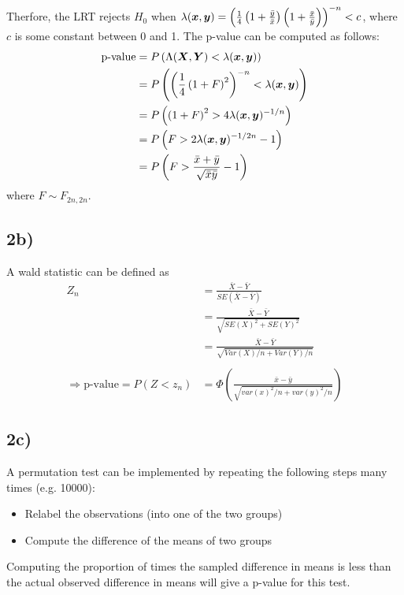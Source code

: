 \documentclass[11pt]{article}
\newcommand{\p}[1]{\left(#1\right)}
\begin{document}
Therfore, the LRT rejects $H_0$ when $\lambda(\bm x, \bm y) = \p{\frac{1}{4}\p{1+\frac{\ybar}{\xbar}}\p{1+\frac{\xbar}{\ybar}}}^{-n} < c$, where $c$ is some constant between 0 and 1. The p-value can be computed as follows:
\[
\begin{aligned}
  \text{p-value} &= P\p{\Lambda(\bm X,\bm Y) < \lambda(\bm x,\bm y)}\\
                 &= P\p{ \p{\frac{1}{4}\p{1+F}^2}^{-n}< \lambda(\bm x,\bm y)}\\
                 &= P\p{ \p{1+F}^2 > 4\lambda(\bm x,\bm y)^{-1/n}}\\
                 &= P\p{ F > 2\lambda(\bm x,\bm y)^{-1/2n}-1}\\
                 &= P\p{ F > \frac{\xbar+\ybar}{\sqrt{\xbar\ybar}}-1}\\
\end{aligned}
\]
where $F\sim F_{2n,2n}$.

\subsection*{2b)}
A wald statistic can be defined as 
\[
\begin{aligned}
  Z_n &= \frac{\bar X - \bar Y}{SE(\bar X - \bar Y)} \\
      &= \frac{\bar X - \bar Y}{\sqrt{SE(X)^2 + SE(Y)^2}}\\
      &= \frac{\bar X - \bar Y}{\sqrt{Var(X)/n + Var(Y)/n}}\\
  \\
  \Rightarrow \text{p-value} = P(Z < z_n) &= \Phi\p{\frac{\bar x - \bar y}{\sqrt{var(x)^2/n + var(y)^2/n}}}
\end{aligned}
\]



\subsection*{2c)}
A permutation test can be implemented by repeating the following steps many times (e.g. 10000):
\begin{itemize}
  \item Relabel the observations (into one of the two groups)
  \item Compute the difference of the means of two groups
\end{itemize}
Computing the proportion of times the sampled difference in means is less than
the actual observed difference in means will give a p-value for this test.
\end{document}
